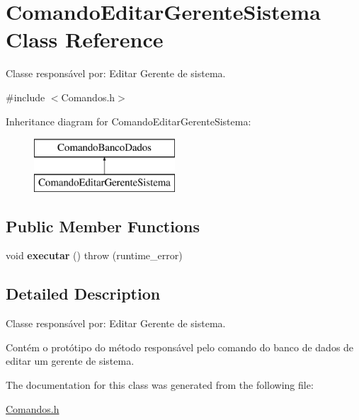 \hypertarget{class_comando_editar_gerente_sistema}{}\section{Comando\+Editar\+Gerente\+Sistema Class Reference}
\label{class_comando_editar_gerente_sistema}


Classe responsável por\+: Editar Gerente de sistema.  




{\ttfamily \#include $<$Comandos.\+h$>$}

Inheritance diagram for Comando\+Editar\+Gerente\+Sistema\+:\begin{figure}[H]
\begin{center}
\leavevmode
\includegraphics[height=2.000000cm]{class_comando_editar_gerente_sistema}
\end{center}
\end{figure}
\subsection*{Public Member Functions}
\begin{DoxyCompactItemize}
\item 
\hypertarget{class_comando_editar_gerente_sistema_ac84b2f4aed833ba46b19bcc230f03b3f}{}\label{class_comando_editar_gerente_sistema_ac84b2f4aed833ba46b19bcc230f03b3f} 
void {\bfseries executar} ()  throw (runtime\+\_\+error)
\end{DoxyCompactItemize}


\subsection{Detailed Description}
Classe responsável por\+: Editar Gerente de sistema. 

Contém o protótipo do método responsável pelo comando do banco de dados de editar um gerente de sistema. 

The documentation for this class was generated from the following file\+:\begin{DoxyCompactItemize}
\item 
\hyperlink{_comandos_8h}{Comandos.\+h}\end{DoxyCompactItemize}
